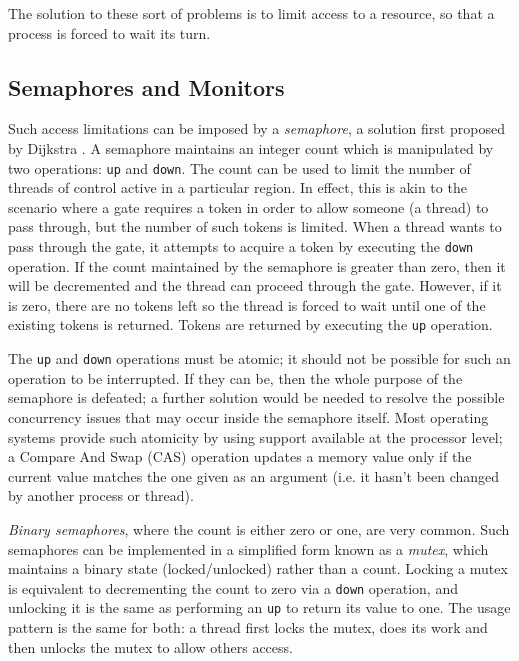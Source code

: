 The solution to these sort of problems is to limit access to a
resource, so that a process is forced to wait its turn.

\subsection{Semaphores and Monitors}
\label{semaphores}

Such access limitations can be imposed by a \emph{semaphore}, a
solution first proposed by Dijkstra \cite{semaphore}.  A semaphore
maintains an integer count which is manipulated by two operations: \texttt{up}
and \texttt{down}.  The count can be used to limit the number of threads of
control active in a particular region.  In effect, this is akin to the
scenario where a gate requires a token in order to allow someone (a
thread) to pass through, but the number of such tokens is limited.
When a thread wants to pass through the gate, it attempts to acquire a
token by executing the \texttt{down} operation.  If the count maintained by
the semaphore is greater than zero, then it will be decremented and
the thread can proceed through the gate.  However, if it is zero,
there are no tokens left so the thread is forced to wait until one of
the existing tokens is returned.  Tokens are returned by executing the
\texttt{up} operation.

The \texttt{up} and \texttt{down} operations must be atomic; it should
not be possible for such an operation to be interrupted.  If they can
be, then the whole purpose of the semaphore is defeated; a further
solution would be needed to resolve the possible concurrency issues
that may occur inside the semaphore itself.  Most operating systems
provide such atomicity by using support available at the processor
level; a Compare And Swap (CAS) operation updates a memory value only
if the current value matches the one given as an argument (i.e. it
hasn't been changed by another process or thread).

\emph{Binary semaphores}, where the count is either zero or one, are
very common.  Such semaphores can be implemented in a simplified form
known as a \emph{mutex}, which maintains a binary state
(locked/unlocked) rather than a count.  Locking a mutex is equivalent
to decrementing the count to zero via a \texttt{down} operation, and unlocking
it is the same as performing an \texttt{up} to return its value to one.  The
usage pattern is the same for both: a thread first locks the mutex,
does its work and then unlocks the mutex to allow others access.

